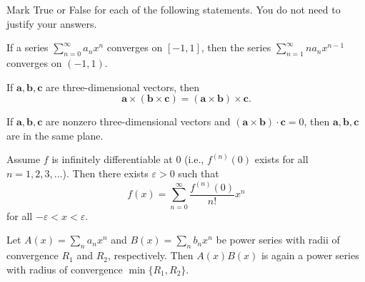 \begin{problem}
Mark True or False for each of the following statements. You do not need to justify your answers.
\begin{problemchoices}
\item If a series $\displaystyle\sum_{n=0}^{\infty}a_nx^n$ converges on $[-1, 1]$, then the series $\displaystyle\sum_{n=1}^{\infty}na_nx^{n-1}$ converges on $(-1, 1)$.
\item If $\mathbf a, \mathbf b, \mathbf c$ are three-dimensional vectors, then
\[
\mathbf a\times(\mathbf b\times\mathbf c)=(\mathbf a\times\mathbf b)\times\mathbf c.
\]
\item If $\mathbf a, \mathbf b, \mathbf c$ are nonzero three-dimensional vectors and $(\mathbf a\times\mathbf b)\cdot\mathbf c=0$, then $\mathbf a, \mathbf b, \mathbf c$ are in the same plane.
\item Assume $f$ is infinitely differentiable at $0$ (i.e., $f^{(n)}(0)$ exists for all $n=1, 2, 3, \ldots$). Then there exists $\varepsilon>0$ such that
\[
f(x)=\sum_{n=0}^{\infty}\frac{f^{(n)}(0)}{n!}x^n
\]
for all $-\varepsilon<x<\varepsilon$.
\item Let $A(x)=\displaystyle\sum_n a_nx^n$ and $B(x)=\displaystyle\sum_n b_nx^n$ be power series with radii of convergence $R_1$ and $R_2$, respectively. Then $A(x)B(x)$ is again a power series with radius of convergence $\min\{R_1, R_2\}$.
\end{problemchoices}
\end{problem}

